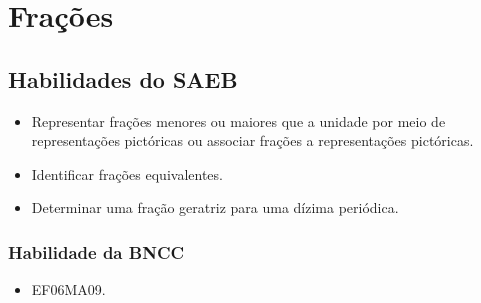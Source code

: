 
\chapter{Frações}

\section*{Habilidades do SAEB}
\begin{itemize}
\item Representar frações menores ou maiores que a
unidade por meio de representações pictóricas ou associar frações a
representações pictóricas.
\item
  Identificar frações equivalentes.
\item
  Determinar uma fração geratriz para uma dízima periódica.
\end{itemize}

\subsection{Habilidade da BNCC} 
\begin{itemize}
\item EF06MA09.
\end{itemize}

